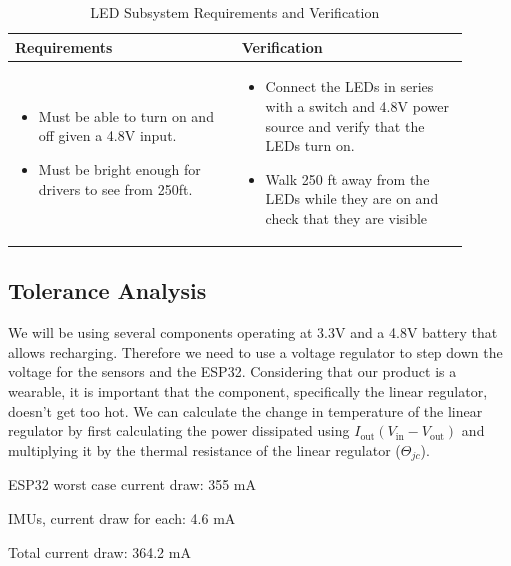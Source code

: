 \documentclass[12pt]{article}
\begin{document}
    \begin{table}[h]
        \centering
        \caption{LED Subsystem Requirements and Verification}
        \begin{tabular}{p{0.45\linewidth}p{0.45\linewidth}}
        \toprule
        \textbf{Requirements} & \textbf{Verification} \\
        \midrule
        \begin{itemize}[leftmargin=*, nosep, after=\strut]
            \item Must be able to turn on and off given a 4.8V input.
            \item Must be bright enough for drivers to see from 250ft.
            
        \end{itemize} &
        \begin{itemize}[leftmargin=*, nosep, after=\strut]
            \item Connect the LEDs in series with a switch and 4.8V power source and verify that the LEDs turn on.
            \item Walk 250 ft away from the LEDs while they are on and check that they are visible
        
        \end{itemize} \\
        \bottomrule
        \end{tabular}
        \end{table}

\subsection{Tolerance Analysis}
We will be using several components operating at 3.3V and a 4.8V 
battery that allows recharging. Therefore we need to use a 
voltage regulator to step down the voltage for the sensors 
and the ESP32. Considering that our product is a wearable, it is important that the component, specifically the linear regulator, doesn't get too hot. We can calculate the change in temperature of the linear regulator by first calculating the power dissipated using $I_{\text{out}} (V_{\text{in}} - V_{\text{out}})$ and multiplying it by the thermal resistance of the linear regulator ($\Theta_{jc}$).

\noindent ESP32 worst case current draw: 355 mA

 IMUs, current draw for each: 4.6 mA

\noindent Total current draw: 364.2 mA
\end{document}
